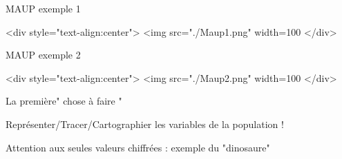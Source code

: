 \documentclass{beamer}
\begin{document}
\begin{frame}{MAUP exemple 1}


<div style="text-align:center">
<img src="./Maup1.png" width=100%
</div>

\end{frame}
\begin{frame}{MAUP exemple 2}

<div style="text-align:center">
<img src="./Maup2.png" width=100%
</div>

\end{frame}
\begin{frame}{La première" chose à faire "}

Représenter/Tracer/Cartographier  les variables de la population !

\end{frame}

\begin{frame}{}

Attention aux seules valeurs chiffrées : exemple du "dinosaure"

\end{frame}
\end{document}
